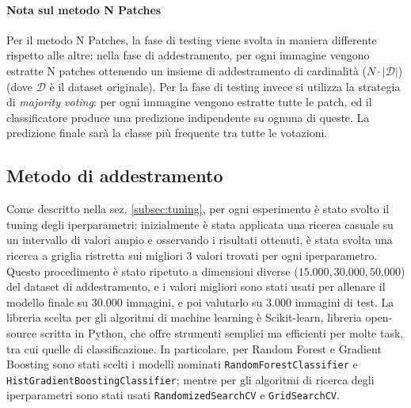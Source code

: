 \paragraph{Nota sul metodo N Patches}
Per il metodo N Patches, la fase di testing viene svolta in maniera differente rispetto alle altre: nella fase di addestramento, per ogni immagine vengono estratte N patches ottenendo un insieme di addestramento di cardinalità ($N\cdot |\mathcal{D}|$) (dove $\mathcal{D}$ è il dataset originale). Per la fase di testing invece si utilizza la strategia di \textit{majority voting}: per ogni immagine vengono estratte tutte le patch, ed il classificatore produce una predizione indipendente su ognuna di queste. La predizione finale sarà la classe più frequente tra tutte le votazioni.\\
\subsection{Metodo di addestramento}
Come descritto nella sez. \ref{subsec:tuning}, per ogni esperimento è stato svolto il tuning degli iperparametri: inizialmente è stata applicata una ricerca casuale su un intervallo di valori ampio e osservando i risultati ottenuti, è stata svolta una ricerca a griglia ristretta sui migliori 3 valori trovati per ogni iperparametro. Questo procedimento è stato ripetuto a dimensioni diverse ($15.000, 30.000, 50.000$) del dataset di addestramento, e i valori migliori sono stati usati per allenare il modello finale su $30.000$ immagini, e poi valutarlo su $3.000$ immagini di test.
La libreria scelta per gli algoritmi di machine learning è Scikit-learn, libreria open-source scritta in Python, che offre strumenti semplici ma efficienti per molte task, tra cui quelle di classificazione.
In particolare, per Random Forest e Gradient Boosting sono stati scelti i modelli nominati \texttt{RandomForestClassifier} e \texttt{HistGradientBoostingClassifier}; mentre per gli algoritmi di ricerca degli iperparametri sono stati usati \texttt{RandomizedSearchCV} e \texttt{GridSearchCV}.

